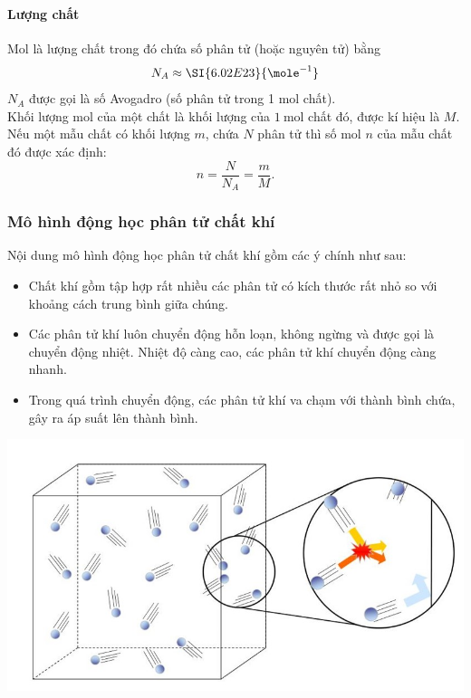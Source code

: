 \begin{tomtat}
	\paragraph{Lượng chất}
	\begin{dn}
		Mol là lượng chất trong đó chứa số phân tử (hoặc nguyên tử) bằng 
		$$N_A\approx\SI{6.02E23}{\mole^{-1}}$$
		$N_A$ được gọi là số Avogadro (số phân tử trong 1 mol chất).\\
		Khối lượng mol của một chất là khối lượng của $\SI{1}{\mole}$ chất đó, được kí hiệu là $M$.\\
		Nếu một mẫu chất có khối lượng $m$, chứa $N$ phân tử thì số mol $n$ của mẫu chất đó được xác định:
		$$n=\dfrac{N}{N_A}=\dfrac{m}{M}.$$
	\end{dn}
	\subsubsection{Mô hình động học phân tử chất khí}
	\begin{boxdn}
		Nội dung mô hình động học phân tử chất khí gồm các ý chính như sau:
		\begin{itemize}
			\item Chất khí gồm tập hợp rất nhiều các phân tử có kích thước rất nhỏ so với khoảng cách trung bình giữa chúng.
			\item Các phân tử khí luôn chuyển động hỗn loạn, không ngừng và được gọi là chuyển động nhiệt. Nhiệt độ càng cao, các phân tử khí chuyển động càng nhanh.
			\item Trong quá trình chuyển động, các phân tử khí va chạm với thành bình chứa, gây ra áp suất lên thành bình.
		\end{itemize}
	\end{boxdn}
	\begin{center}
		\includegraphics[width=0.4\linewidth]{figs/VN12-Y24-PH-SYL-009-2}
	\end{center}

\end{tomtat}

